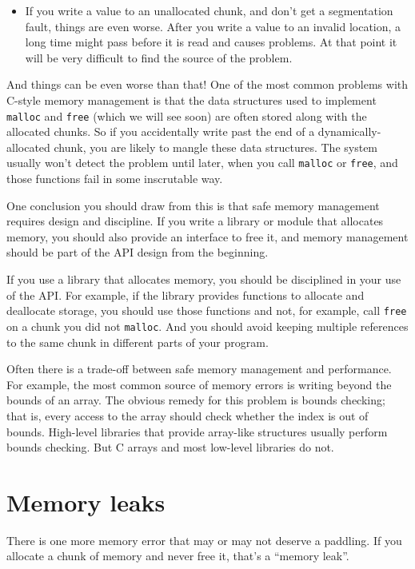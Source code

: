 \documentclass[12pt]{book}
\begin{document}
{\begin{itemize}
\item If you write a value to an unallocated chunk, and don't get a segmentation fault, things are even worse.  After you write a value to an invalid location, a long time might pass before it is read and causes problems.  At that point it will be very difficult to find the source of the problem.

\end{itemize} 

And things can be even worse than that!  One of the most common
problems with C-style memory management is that the data structures
used to implement {\tt malloc} and {\tt free} (which we will see soon)
are often stored along with the allocated chunks.  So if you
accidentally write past the end of a dynamically-allocated chunk, you
are likely to mangle these data structures.  The system usually won't
detect the problem until later, when you call {\tt malloc} or
{\tt free}, and those functions fail in some inscrutable way.

One conclusion you should draw from this is that safe memory
management requires design and discipline.  If you write a library
or module that allocates memory, you should also provide an
interface to free it, and memory management should be part of
the API design from the beginning.

If you use a library that allocates memory, you should be disciplined
in your use of the API.  For example, if the library provides
functions to allocate and deallocate storage, you should use those
functions and not, for example, call {\tt free} on a chunk you did not
{\tt malloc}.  And you should avoid keeping multiple references to the
same chunk in different parts of your program.

Often there is a trade-off between safe memory management and performance.
For example, the most common source of memory errors is writing 
beyond the bounds of an array.  The obvious remedy for this problem
is bounds checking; that is, every access to the array should check
whether the index is out of bounds.  High-level libraries that provide
array-like structures usually perform bounds checking.  But C arrays
and most low-level libraries do not.


\section{Memory leaks}
\label{leak}

There is one more memory error that may or may not deserve a paddling.
If you allocate a chunk of memory and never free it, that's a ``memory
leak''.

}
\end{document}
